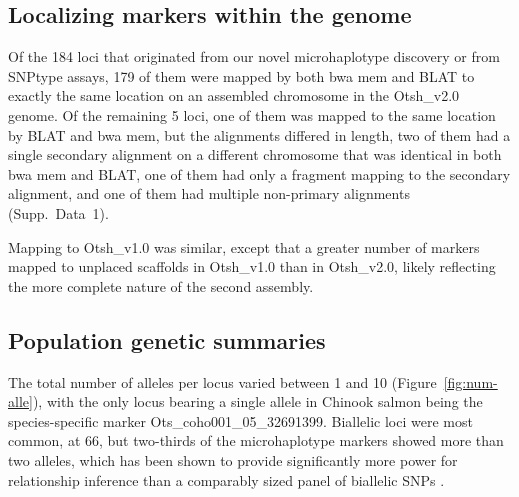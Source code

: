 \subsection*{Localizing markers within the genome}

Of the 184 loci that originated from our novel
microhaplotype discovery or from SNPtype assays, 179 of them were mapped by both bwa mem and
BLAT to exactly the same location
on an assembled chromosome in the Otsh\_v2.0 genome.
Of the remaining 5 loci, one of them was mapped to the same location by BLAT and bwa mem, but
the alignments differed in length, two of them had a single secondary alignment on a different chromosome
that was identical in both bwa mem and BLAT, one of them had only a fragment mapping to
the secondary alignment, and one of them had multiple
non-primary alignments (Supp.~Data~1).

Mapping to Otsh\_v1.0 was similar, except that a greater number of markers mapped to unplaced
scaffolds in Otsh\_v1.0 than in Otsh\_v2.0, likely reflecting the more complete nature of the
second assembly.


\subsection*{Population genetic summaries}

The total number of alleles per locus varied between 1 and 10 (Figure~\ref{fig:num-alle}), with the
only locus bearing a single allele in Chinook salmon being the species-specific marker Ots\_coho001\_05\_32691399. 
Biallelic loci were most common, at 66, but two-thirds of the microhaplotype markers
showed more than two alleles, which has been shown to provide significantly more
power for relationship inference than a comparably sized panel of biallelic SNPs
\citep{baetscher2018microhaplotypes}.


